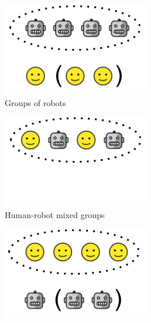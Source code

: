 \begin{figure}[ht]
    \centering
    \begin{subfigure}[b]{0.3\textwidth}
        \includegraphics[width=\textwidth]{images/introduction/groups-robots.png}
        \caption{Groups of robots}
        \label{fig:groups-robots}
    \end{subfigure}
    \begin{subfigure}[b]{0.3\textwidth}
        \includegraphics[width=\textwidth]{images/introduction/mixed-groups.png}
        \caption{Human-robot mixed groups}
        \label{fig:mixed-groups}
    \end{subfigure}
    \begin{subfigure}[b]{0.3\textwidth}
        \includegraphics[width=\textwidth]{images/introduction/groups-humans.png}

\end{subfigure}
\end{figure}
